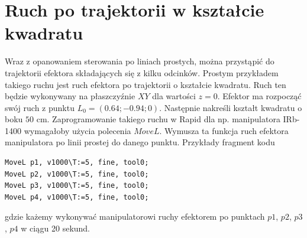 \documentclass[eng,printmode]{mgr}
\begin{document}
\section{Ruch po trajektorii w kształcie kwadratu}
Wraz z opanowaniem sterowania po liniach prostych, można przystąpić do trajektorii efektora składających się z kilku odcinków. Prostym przykładem takiego ruchu jest ruch efektora po trajektorii o kształcie kwadratu. Ruch ten będzie wykonywany na płaszczyźnie $XY$ dla wartości $z=0$. Efektor ma rozpocząć swój ruch z punktu $L_0=(0.64; -0.94; 0)$. Następnie nakreśli kształt kwadratu o boku $50 $ cm. Zaprogramowanie takiego ruchu w Rapid dla np. manipulatora IRb-1400 wymagałoby użycia polecenia $MoveL$. Wymusza ta funkcja ruch efektora manipulatora po linii prostej do danego punktu. Przykłady fragment kodu


\begin{lstlisting}[frame=single] 
MoveL p1, v1000\T:=5, fine, tool0;
MoveL p2, v1000\T:=5, fine, tool0;
MoveL p3, v1000\T:=5, fine, tool0;
MoveL p4, v1000\T:=5, fine, tool0;
\end{lstlisting}
gdzie każemy wykonywać manipulatorowi ruchy efektorem po punktach $p1$, $p2$, $p3$, $p4$ w ciągu 20 sekund.
\end{document}
